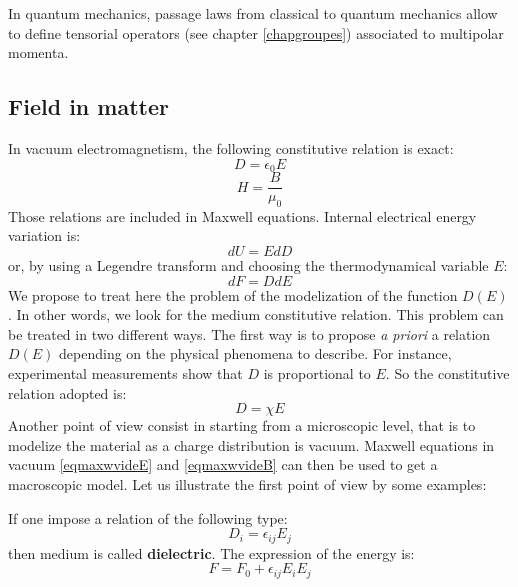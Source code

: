 \documentclass[12pt]{book}
\begin{document}
\begin{rem} In quantum mechanics, passage laws from classical to quantum
  mechanics allow to define tensorial operators (see chapter
\ref{chapgroupes}) associated to multipolar momenta. 
\end{rem}
\subsection{Field in matter}\label{secchampdslamat}
In vacuum electromagnetism, the following constitutive relation is exact:
\begin{equation}\label{eqmaxwvideE}
D=\epsilon_0E
\end{equation}
\begin{equation}\label{eqmaxwvideB}
H=\frac{B}{\mu_0}
\end{equation}
Those relations are included in Maxwell equations. Internal electrical energy
variation is:
\begin{equation}
dU=EdD
\end{equation}
or, by using a Legendre transform and choosing the thermodynamical variable
$E$: 
\begin{equation}
dF=DdE
\end{equation}
We propose to treat here the problem of the modelization of the function
$D(E)$. In other words, we look for the medium constitutive relation. This
problem can be treated in two different ways. The first way is to propose {\it
  a priori} a relation $D(E)$ depending on the physical phenomena to
describe. For instance, experimental measurements show that $D$ is
proportional to $E$. So the constitutive relation adopted is:
\begin{equation}
D=\chi E
\end{equation}
Another point of view consist in starting from a microscopic level, that is to
modelize the material as a charge distribution is vacuum. Maxwell equations in
vacuum 
\ref{eqmaxwvideE} and \ref{eqmaxwvideB} can then be used to get a macroscopic
model. Let us illustrate the first point of view by some examples:
\begin{exmp}
If one impose a relation of the following type:
\begin{equation}
D_i=\epsilon_{ij}E_j
\end{equation}
then medium is called {\bf dielectric}.
The expression of the energy is:
\begin{equation}
F=F_0+\epsilon_{ij}E_iE_j
\end{equation}
\end{exmp}
\end{document}
